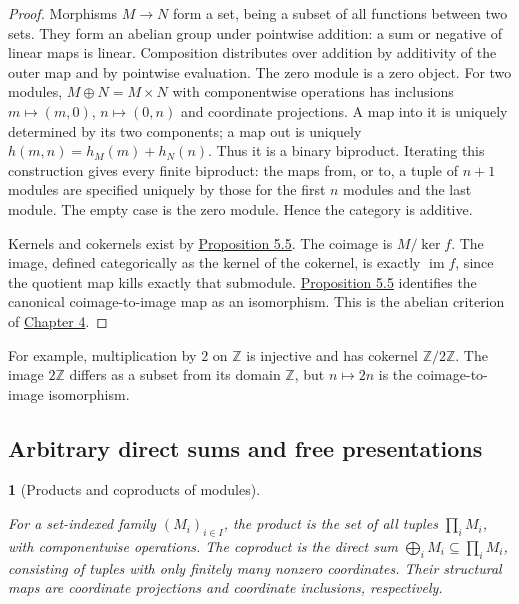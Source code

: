 \documentclass[11pt,a4paper]{article}
\newcommand{\mathheading}{}
\theoremstyle{plain}
\newtheorem*{plainstatement}{\mathheading}
\theoremstyle{definition}
\newenvironment{mathstatement}[3]{\renewcommand{\mathheading}{#1 #2}\begin{plainstatement}[#3]}{\end{plainstatement}}
\begin{document}
\begin{proof}

Morphisms \(M\to N\) form a set, being a subset of all functions between two sets. They form an abelian group under pointwise addition: a sum or negative of linear maps is linear. Composition distributes over addition by additivity of the outer map and by pointwise evaluation. The zero module is a zero object. For two modules, \(M\oplus N=M\times N\) with componentwise operations has inclusions \(m\mapsto(m,0)\), \(n\mapsto(0,n)\) and coordinate projections. A map into it is uniquely determined by its two components; a map out is uniquely \(h(m,n)=h_M(m)+h_N(n)\). Thus it is a binary biproduct. Iterating this construction gives every finite biproduct: the maps from, or to, a tuple of \(n+1\) modules are specified uniquely by those for the first \(n\) modules and the last module. The empty case is the zero module. Hence the category is additive.


Kernels and cokernels exist by \hyperref[env-5-5]{Proposition 5.5}. The coimage is \(M/\ker f\). The image, defined categorically as the kernel of the cokernel, is exactly \(\operatorname{im}f\), since the quotient map kills exactly that submodule. \hyperref[env-5-5]{Proposition 5.5} identifies the canonical coimage-to-image map as an isomorphism. This is the abelian criterion of \hyperref[chapter-04]{Chapter 4}.


\end{proof}
 
For example, multiplication by \(2\) on \(\mathbb Z\) is injective and has cokernel \(\mathbb Z/2\mathbb Z\). The image \(2\mathbb Z\) differs as a subset from its domain \(\mathbb Z\), but \(n\mapsto2n\) is the coimage-to-image isomorphism.

 
\subsection{Arbitrary direct sums and free presentations}
\label{free}
 
\begin{mathstatement}{Proposition}{5.7}{Products and coproducts of modules}
\label{env-5-7}

For a set-indexed family \((M_i)_{i\in I}\), the product is the set of all tuples \(\prod_i M_i\), with componentwise operations. The coproduct is the \emph{direct sum} \(\bigoplus_i M_i\subseteq\prod_i M_i\), consisting of tuples with only finitely many nonzero coordinates. Their structural maps are coordinate projections and coordinate inclusions, respectively.


\par{}\par

\end{mathstatement}
 
\end{document}
